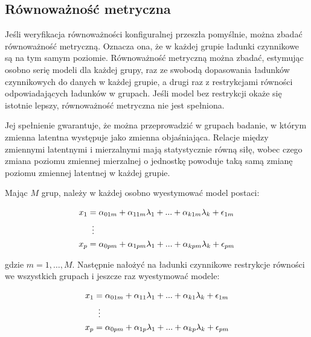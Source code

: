 \documentclass[12pt]{article}
\begin{document}
\hypertarget{ruxf3wnowaux17cnoux15bux107-metryczna}{%
\subsection{Równoważność metryczna}\label{ruxf3wnowaux17cnoux15bux107-metryczna}}

Jeśli weryfikacja równoważności konfiguralnej przeszła pomyślnie, można zbadać równoważność metryczną. Oznacza ona, że w każdej grupie ładunki czynnikowe są na tym samym poziomie. Równoważność metryczną można zbadać, estymując osobno serię modeli dla każdej grupy, raz ze swobodą dopasowania ładunków czynnikowych do danych w każdej grupie, a drugi raz z restrykcjami równości odpowiadających ładunków w grupach. Jeśli model bez restrykcji okaże się istotnie lepszy, równoważność metryczna nie jest spełniona.

Jej spełnienie gwarantuje, że można przeprowadzić w grupach badanie, w którym zmienna latentna występuje jako zmienna objaśniająca. Relacje między zmiennymi latentnymi i mierzalnymi mają statystycznie równą siłę, wobec czego zmiana poziomu zmiennej mierzalnej o jednostkę powoduje taką samą zmianę poziomu zmiennej latentnej w każdej grupie.

Mając \(M\) grup, należy w każdej osobno wyestymować model postaci:

\begin{align} 
\label{eq:group-model}
\begin{split}
x_1 &= \alpha_{01m} + \alpha_{11m} \lambda_1 + ... + \alpha_{k1m} \lambda_k + \epsilon_{1m}\\
& \vdotswithin{=} \\
x_p &= \alpha_{0pm} + \alpha_{1pm} \lambda_1 + ... + \alpha_{kpm} \lambda_k + \epsilon_{pm}\\
\end{split}
\end{align}

gdzie \(m = 1, …, M\). Następnie nałożyć na ładunki czynnikowe restrykcje równości we wszystkich grupach i jeszcze raz wyestymować modele:

\begin{align} 
\label{eq:restricted-loadings}
\begin{split}
x_1 &= \alpha_{01m} + \alpha_{11} \lambda_1 + ... + \alpha_{k1} \lambda_k + \epsilon_{1m}\\
& \vdotswithin{=} \\
x_p &= \alpha_{0pm} + \alpha_{1p} \lambda_1 + ... + \alpha_{kp} \lambda_k + \epsilon_{pm}\\
\end{split}
\end{align}
\end{document}
